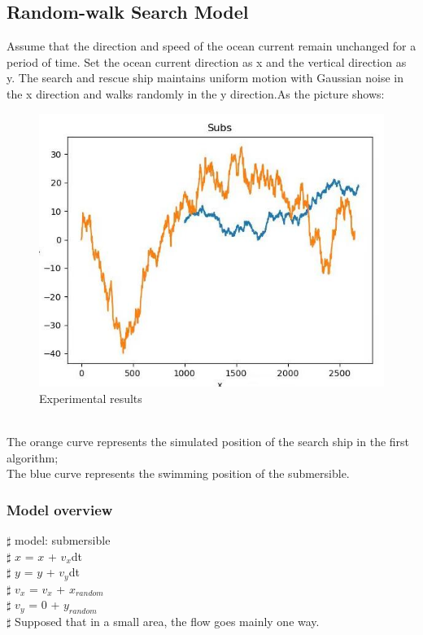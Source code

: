 \documentclass[12pt]{article}  %
\begin{document}
\subsection{Random-walk Search Model}
\indent Assume that the direction and speed of the ocean current remain unchanged for a period of time. Set the ocean current direction as x and the vertical direction as y. The search and rescue ship maintains uniform motion with Gaussian noise in the x direction and walks randomly in the y direction.As the picture shows:

\begin{figure}[htbp]  %
    \centering  %
    \includegraphics[width=.9\textwidth]{randomwalk111.jpg} %
    \caption{Experimental results} %
    \end{figure}
    \vspace{-0.8cm}
    \indent \\

\indent The orange curve represents the simulated position of the search ship in the first algorithm;\\
\indent The blue curve represents the swimming position of the submersible.
    \subsubsection{Model overview}
    $\sharp$  model: submersible\\
     $\sharp$ $x$ = $x$ + $v_x$dt\\
    $\sharp$ $y$ = $y$ + $v_y$dt\\
    $\sharp$ $v_x$ = $v_x$ +  $x_{random}$\\
    $\sharp$ $v_y$ = 0 +  $y_{random}$\\
    $\sharp$ Supposed that in a small area, the flow goes mainly one way.\\
    
\end{document}
